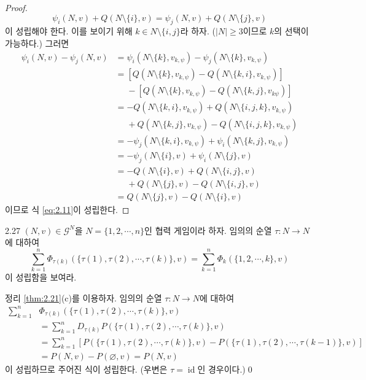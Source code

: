\documentclass{article}
\numberwithin{equation}{section}
\begin{document}
\begin{proof}
	\begin{equation}
		\label{eq:2.11}
		\psi_i(N,v)+Q(N\setminus\{i\},v)=\psi_j(N,v)+Q(N\setminus\{j\},v)
	\end{equation}
	이 성립해야 한다. 이를 보이기 위해 $k\in N\setminus\{i,j\}$라 하자. ($\vert N\vert\geq3$이므로 $k$의 선택이 가능하다.) 그러면
	\[
		\begin{aligned}
			\psi_i(N,v)-\psi_j(N,v)&=\psi_i(N\setminus\{k\},v_{k,\psi})-\psi_j(N\setminus\{k\},v_{k,\psi})\\
			&=[Q(N\setminus\{k\},v_{k,\psi})-Q(N\setminus\{k,i\},v_{k,\psi})]\\
			&\phantom{=}-[Q(N\setminus\{k\},v_{k,\psi})-Q(N\setminus\{k,j\},v_{k\psi})]\\
			&=-Q(N\setminus\{k,i\},v_{k,\psi})+Q(N\setminus\{i,j,k\},v_{k,\psi})\\
			&\phantom{=}+Q(N\setminus\{k,j\},v_{k,\psi})-Q(N\setminus\{i,j,k\},v_{k,\psi})\\
			&=-\psi_j(N\setminus\{k,i\},v_{k,\psi})+\psi_i(N\setminus\{k,j\},v_{k,\psi})\\
			&=-\psi_j(N\setminus\{i\},v)+\psi_i(N\setminus\{j\},v)\\
			&=-Q(N\setminus\{i\},v)+Q(N\setminus\{i,j\},v)\\
			&\phantom{=}+Q(N\setminus\{j\},v)-Q(N\setminus\{i,j\},v)\\
			&=Q(N\setminus\{j\},v)-Q(N\setminus\{i\},v)
		\end{aligned}
	\]
	이므로 식 \ref{eq:2.11}이 성립한다.
\end{proof}

\begin{prob}{}{2.27}
	$(N,v)\in\mathcal G^N$을 $N=\{1,2,\cdots,n\}$인 협력 게임이라 하자. 임의의 순열 $\tau:N\to N$에 대하여
	\[
		\sum_{k=1}^n\Phi_{\tau(k)}(\{\tau(1),\tau(2),\cdots,\tau(k)\},v)=\sum_{k=1}^n\Phi_k(\{1,2,\cdots,k\},v)
	\]
	이 성립함을 보여라.
\end{prob}

\begin{sol}
	정리 \ref{thm:2.21}(c)를 이용하자. 임의의 순열 $\tau:N\to N$에 대하여
	\[
		\begin{aligned}
			\sum_{k=1}^n&\Phi_{\tau(k)}(\{\tau(1),\tau(2),\cdots,\tau(k)\},v)\\
			&=\sum_{k=1}^nD_{\tau(k)}P(\{\tau(1),\tau(2),\cdots,\tau(k)\},v)\\
			&=\sum_{k=1}^n[P(\{\tau(1),\tau(2),\cdots,\tau(k)\},v)-P(\{\tau(1),\tau(2),\cdots,\tau(k-1)\},v)]\\
			&=P(N,v)-P(\varnothing,v)=P(N,v)
		\end{aligned}
	\]
	이 성립하므로 주어진 식이 성립한다. (우변은 $\tau=\operatorname{id}$인 경우이다.)\qed
\end{sol}
\end{document}
